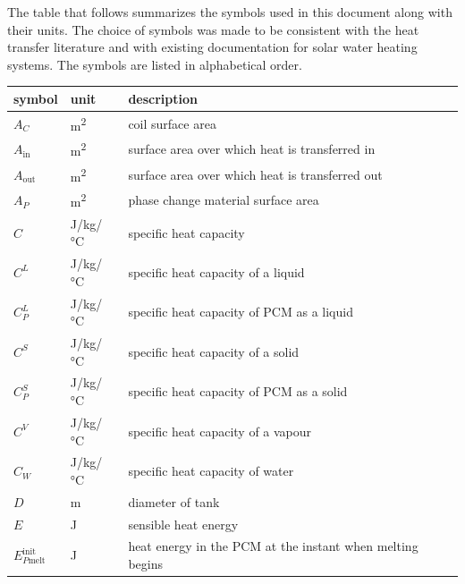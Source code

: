 \documentclass[12pt]{article}
\begin{document}
The table that follows summarizes the symbols used in this document along with
their units.  The choice of symbols was made to be consistent with the heat
transfer literature and with existing documentation for solar water heating
systems.  The symbols are listed in alphabetical order.

\renewcommand{\arraystretch}{1.2}
\noindent \begin{longtable*}{l l p{12cm}} \toprule
  \textbf{symbol} & \textbf{unit} & \textbf{description}\\
  \midrule 
  $A_C$ & \si[per-mode=symbol] {\square\metre} & coil surface area
  \\
  $A_\text{in}$ & \si[per-mode=symbol] {\square\metre} & surface area over 
  which heat is transferred in
  \\ 
  $A_\text{out}$ & \si[per-mode=symbol] {\square\metre} & surface area over 
  which heat is transferred out
  \\
  $A_P$ & \si[per-mode=symbol] {\square\metre} & phase change material surface
  area
  \\ 
  $C$ & \si[per-mode=symbol] {\joule\per \kilogram\per \celsius} &
  specific heat capacity
  \\
  $C^L$ & \si[per-mode=symbol] {\joule\per\kilo\gram\per\celsius} & specific 
  heat capacity of a liquid 
  \\ 
  $C^L_P$ & \si[per-mode=symbol] {\joule\per \kilogram\per \celsius} & specific
  heat capacity of PCM as a liquid
  \\
  $C^S$ & \si[per-mode=symbol] {\joule\per\kilo\gram\per\celsius} & specific 
  heat capacity of a solid
  \\
  $C^S_P$ & \si[per-mode=symbol] {\joule\per \kilogram\per \celsius} & specific
  heat capacity of PCM as a solid
  \\
  $C^V$ & \si[per-mode=symbol] {\joule\per \kilogram\per \celsius} & specific
  heat capacity of a vapour
  \\
  $C_W$ & \si[per-mode=symbol] {\joule\per \kilogram\per \celsius} & specific
  heat capacity of water
  \\  
  $D$ & \si{\metre} & diameter of tank
  \\
  $E$ & \si[per-mode=symbol] {\joule} & sensible heat energy
  \\
  $E_{P\text{melt}}^\text{init}$ & \si[per-mode=symbol] {\joule} & heat energy
  in the PCM at
  the instant
  when melting begins
  \\ 

\end{longtable*}
\end{document}
